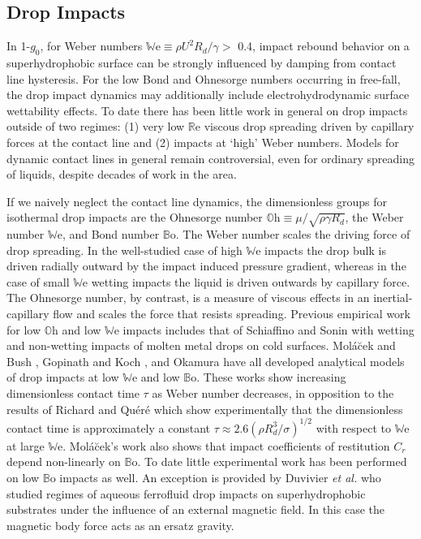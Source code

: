 \documentclass[aip,reprint, floatfix]{revtex4-1}
\begin{document}
\subsection{Drop Impacts}
In 1-$g_0$, for Weber numbers $\mathbb{W}\mbox{e} \equiv \rho U^2 R_d/\gamma >$ 0.4, impact rebound behavior on a superhydrophobic surface can be strongly influenced by damping from contact line hysteresis. For the low Bond and Ohnesorge numbers occurring in free-fall, the drop impact dynamics may additionally include electrohydrodynamic surface wettability effects. To date there has been little work in general on drop impacts outside of two regimes: (1) very low $\mathbb{R}\mbox{e}$ viscous drop spreading driven by capillary forces at the contact line and (2) impacts at `high' Weber numbers. Models for dynamic contact lines in general remain controversial, even for ordinary spreading of liquids, despite decades of work in the area. 

If we naively neglect the contact line dynamics, the dimensionless groups for isothermal drop impacts are the Ohnesorge number $\mathbb{O}\mbox{h} \equiv \mu/\sqrt{\rho \gamma R_d}$, the Weber number $\mathbb{W}\mbox{e}$, and Bond number $\mathbb{B}\mbox{o}$. The Weber number scales the driving force of drop spreading. In the well-studied case of high $\mathbb{W}\mbox{e}$ impacts the drop bulk is driven radially outward by the impact induced pressure gradient, whereas in the case of small $\mathbb{W}\mbox{e}$ wetting impacts the liquid is driven outwards by capillary force. The Ohnesorge number, by contrast, is a measure of viscous effects in an inertial-capillary flow and scales the force that resists spreading. Previous empirical work for low $\mathbb{O}\mbox{h}$ and low $\mathbb{W}\mbox{e}$ impacts includes that of Schiaffino and Sonin \cite{schiaffino_molten_1997} with wetting and non-wetting impacts of molten metal drops on cold surfaces. Mol\'{a}\u{c}ek and Bush \cite{molacek_quasi-static_2012}, Gopinath and Koch \cite{gopinath_collision_2002}, and Okamura \cite{okumura_water_2003} have all developed analytical models of drop impacts at low $\mathbb{W}\mbox{e}$ and low $\mathbb{B}\mbox{o}$. These works show increasing dimensionless contact time $\tau$ as Weber number decreases, in opposition to the results of Richard and Qu\'{e}r\'{e} \cite{richard_surface_2002} which show experimentally that the dimensionless contact time is approximately a constant $\tau \approx 2.6(\rho R^3_d/\sigma)^{1/2}$ with respect to $\mathbb{W}\mbox{e}$ at large $\mathbb{W}\mbox{e}$. Mol\'{a}\u{c}ek's work also shows that impact coefficients of restitution $C_r$ depend non-linearly on $\mathbb{B}\mbox{o}$. To date little experimental work has been performed on low $\mathbb{B}\mbox{o}$ impacts as well. An exception is provided by Duvivier \emph{et al.} \cite{duvivier_drop_2012} who studied regimes of aqueous ferrofluid drop impacts on superhydrophobic substrates under the influence of an external magnetic field. In this case the magnetic body force acts as an ersatz gravity.
\end{document}
